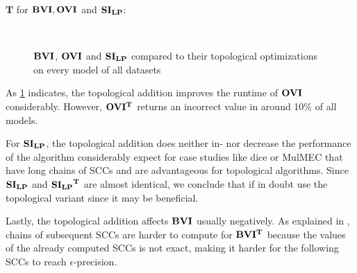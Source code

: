 $\mathbf{T}$ for $\mathbf{BVI}, \mathbf{OVI}$ and $\mathbf{SI_{LP}}$:
\begin{figure}[h!]
    \centering
    \
    \caption{$\mathbf{BVI}$, $\mathbf{OVI}$ and $\mathbf{SI_{LP}}$ compared to their topological optimizations on every model of all datasets}%
    \label{fig:Scatter_T}%
    \end{figure}
\FloatBarrier

As \ref{fig:Scatter_T} indicates, the topological addition improves the runtime of $\mathbf{OVI}$ considerably. 
However, $\mathbf{OVI^T}$ returns an incorrect value in around 10\% of all models.

For $\mathbf{SI_{LP}}$, the topological addition does neither in- nor decrease the performance of the algorithm considerably expect for case studies
like dice or MulMEC that have long chains of SCCs and are advantageous for topological algorithms.
Since $\mathbf{SI_{LP}}$ and $\mathbf{\mathbf{SI_{LP}}^T}$ are almost identical, we conclude that if in doubt use the topological variant since it may be beneficial.

Lastly, the topological addition affects $\mathbf{BVI}$ usually negatively. As explained in \cite{gandalf}, 
chains of subsequent SCCs are harder to compute for $\mathbf{BVI^T}$ because the values of the already computed SCCs is not exact, 
making it harder for the following SCCs to reach $\epsilon$-precision.

